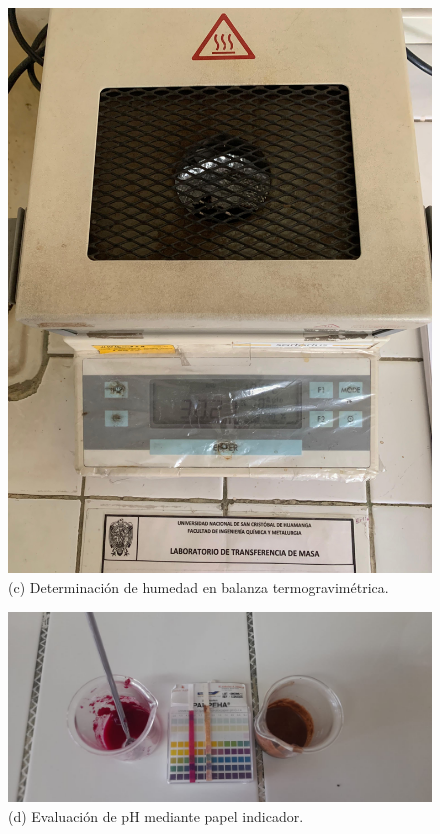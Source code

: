 \documentclass[manuscript,screen,review]{acmart}
\begin{document}
\begin{figure}[H]
  \vspace{1ex}
  \begin{minipage}{0.3\linewidth}
    \centering
    \includegraphics[width=\linewidth]{imagen/Humedad.jpeg}
    \vspace{1mm}
    \small (c) Determinación de humedad en balanza termogravimétrica.
  \end{minipage}
  \hspace{1em}
  \begin{minipage}{0.2\linewidth}
    \centering
    \includegraphics[width=\linewidth]{imagen/pH.jpeg}
    \vspace{1mm}
    \small (d) Evaluación de pH mediante papel indicador.
  \end{minipage}


\end{figure}
\end{document}
